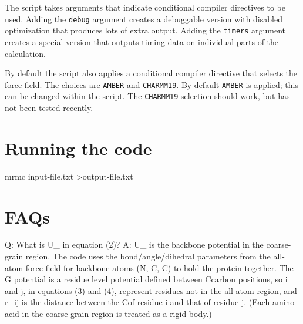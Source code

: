 \documentclass{article}      %
\begin{document}
The script takes arguments that indicate conditional compiler directives to be used.  Adding the \verb+debug+ argument creates a debuggable version with disabled optimization that produces lots of extra output.  Adding the \verb+timers+ argument creates a special version that outputs timing data on individual parts of the calculation.

By default the script also applies a conditional compiler directive that selects the force field.  The choices are \verb+AMBER+ and \verb+CHARMM19+.   By default \verb+AMBER+ is applied; this can be changed within the script.    The \verb+CHARMM19+ selection should work, but has not been tested recently.   


\section{Running the code}

mrmc input-file.txt >output-file.txt


\section{FAQs}

Q:  What is U_ in equation (2)?
A:  U_ is the backbone potential in the coarse-grain region.  The code uses the bond/angle/dihedral parameters from the all-atom force field for backbone atoms (N, C\alpha, C) to hold the protein together.  The G potential is a residue level potential defined between C\alpha carbon positions, so i and j, in equations (3) and (4), represent residues not in the all-atom region, and r_{ij} is the distance between the C\alpha of residue i and that of residue j.  (Each amino acid in the coarse-grain region is treated as a rigid body.)
\end{document}
